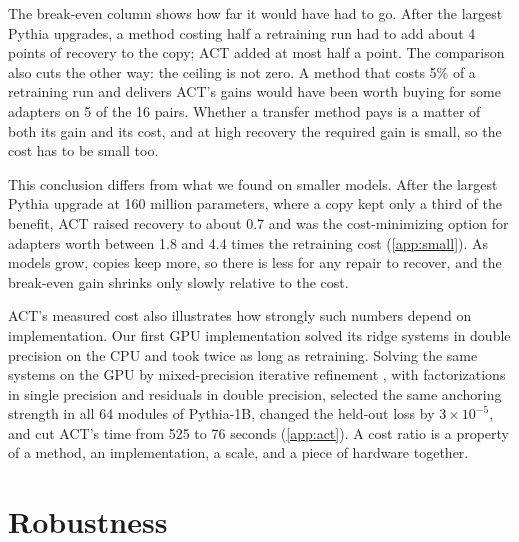 \documentclass[preprint,12pt,authoryear]{elsarticle}
\begin{document}
The break-even column shows how far it would have had to go. After the largest Pythia upgrades, a method costing half a retraining run had to add about 4 points of recovery to the copy; ACT added at most half a point. The comparison also cuts the other way: the ceiling is not zero. A method that costs 5\% of a retraining run and delivers ACT's gains would have been worth buying for some adapters on 5 of the 16 pairs. Whether a transfer method pays is a matter of both its gain and its cost, and at high recovery the required gain is small, so the cost has to be small too.

This conclusion differs from what we found on smaller models. After the largest Pythia upgrade at 160 million parameters, where a copy kept only a third of the benefit, ACT raised recovery to about 0.7 and was the cost-minimizing option for adapters worth between 1.8 and 4.4 times the retraining cost (\ref{app:small}). As models grow, copies keep more, so there is less for any repair to recover, and the break-even gain shrinks only slowly relative to the cost.

ACT's measured cost also illustrates how strongly such numbers depend on implementation. Our first GPU implementation solved its ridge systems in double precision on the CPU and took twice as long as retraining. Solving the same systems on the GPU by mixed-precision iterative refinement \citep{higham2002accuracy}, with factorizations in single precision and residuals in double precision, selected the same anchoring strength in all 64 modules of Pythia-1B, changed the held-out loss by $3\times10^{-5}$, and cut ACT's time from 525 to 76 seconds (\ref{app:act}). A cost ratio is a property of a method, an implementation, a scale, and a piece of hardware together.

\section{Robustness}\label{sec:robust}
\end{document}
